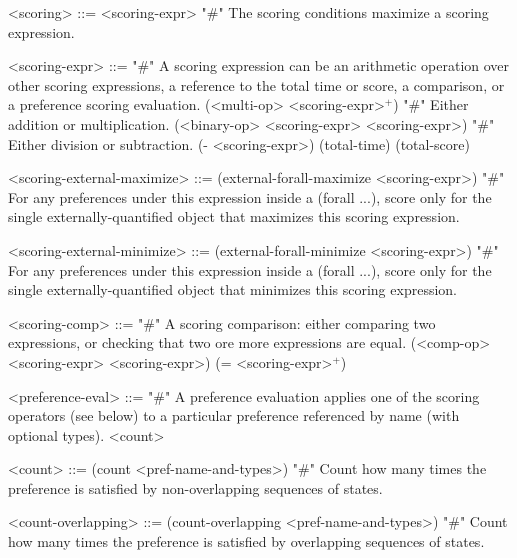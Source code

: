 \documentclass{article}
\begin{document}
\begin{grammar}
<scoring> ::= <scoring-expr> "#" The scoring conditions maximize a scoring expression. 

<scoring-expr> ::= "#" A scoring expression can be an arithmetic operation over other scoring expressions, a reference to the total time or score, a comparison, or a preference scoring evaluation.
        \alt (<multi-op> <scoring-expr>$^+$) "#" Either addition or multiplication.
        \alt (<binary-op> <scoring-expr> <scoring-expr>) "#" Either division or subtraction.
        \alt (- <scoring-expr>)
        \alt (total-time) 
        \alt (total-score) 
        
    

<scoring-external-maximize> ::= (external-forall-maximize <scoring-expr>) "#" For any preferences under this expression inside a (forall ...), score only for the single externally-quantified object that maximizes this scoring expression.
    

<scoring-external-minimize> ::= (external-forall-minimize <scoring-expr>) "#" For any preferences under this expression inside a (forall ...), score only for the single externally-quantified object that minimizes this scoring expression.
    

<scoring-comp> ::=  "#" A scoring comparison: either comparing two expressions, or checking that two ore more expressions are equal.
        \alt (<comp-op> <scoring-expr> <scoring-expr>) 
        \alt (= <scoring-expr>$^+$)
    

<preference-eval> ::= "#" A preference evaluation applies one of the scoring operators (see below) to a particular preference referenced by name (with optional types). 
        \alt <count>

    

<count> ::= (count <pref-name-and-types>) "#" Count how many times the preference is satisfied by non-overlapping sequences of states.

<count-overlapping> ::= (count-overlapping <pref-name-and-types>) "#" Count how many times the preference is satisfied by overlapping sequences of states.


\end{grammar}
\end{document}
